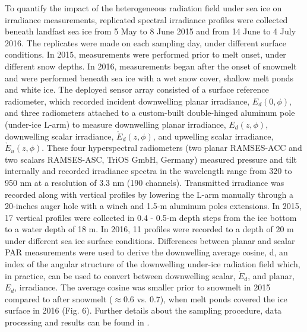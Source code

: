 \documentclass[essd, manuscript]{copernicus}
\begin{document}
To quantify the impact of the heterogeneous radiation field under sea ice on irradiance measurements, replicated spectral irradiance profiles were collected beneath landfast sea ice from 5 May to 8 June 2015 and from 14 June to 4 July 2016. The replicates were made on each sampling day, under different surface conditions. In 2015, measurements were performed prior to melt onset, under different snow depths. In 2016, measurements began after the onset of snowmelt and were performed beneath sea ice with a wet snow cover, shallow melt ponds and white ice. The deployed sensor array consisted of a surface reference radiometer, which recorded incident downwelling planar irradiance, $E_d(0,\phi)$, and three radiometers attached to a custom-built double-hinged aluminum pole (under-ice L-arm) to measure downwelling planar irradiance, $E_d(z,\phi)$, downwelling scalar irradiance, $\mathring{E}_d(z,\phi)$, and upwelling scalar irradiance, $\mathring{E}_u(z,\phi)$. These four hyperspectral radiometers (two planar RAMSES-ACC and two scalars RAMSES-ASC, TriOS GmbH, Germany) measured pressure and tilt internally and recorded irradiance spectra in the wavelength range from 320 to 950 nm at a resolution of 3.3 nm (190 channels). Transmitted irradiance was recorded along with vertical profiles by lowering the L-arm manually through a 20-inches auger hole with a winch and 1.5-m aluminum poles extensions. In 2015, 17 vertical profiles were collected in 0.4 - 0.5-m depth steps from the ice bottom to a water depth of 18 m. In 2016, 11 profiles were recorded to a depth of 20 m under different sea ice surface conditions. Differences between planar and scalar PAR measurements were used to derive the downwelling average cosine, \textmu d, an index of the angular structure of the downwelling under-ice radiation field which, in practice, can be used to convert between downwelling scalar, $\mathring{E}_d$, and planar, $E_d$, irradiance. The average cosine was smaller prior to snowmelt in 2015 compared to after snowmelt ($\approx$0.6 vs. 0.7), when melt ponds covered the ice surface in 2016 (Fig. 6). Further details about the sampling procedure, data processing and results can be found in \citet{Matthes2019}.
\end{document}
